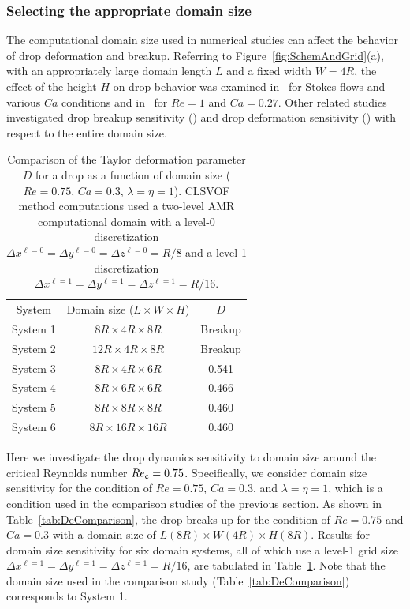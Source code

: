 \documentclass{elsarticle}
\newcommand{\LWH}{L\times W \times H}
\newcommand{\lwh}[3]{L(#1R)\times W(#2R) \times H(#3R)}
\begin{document}
\subsubsection{Selecting the appropriate domain size}

The computational domain size used in numerical studies can affect the behavior
of drop deformation and breakup.  Referring to
Figure~\ref{fig:SchemAndGrid}(a), with an appropriately large domain length $L$
and a fixed width $W=4R$, the effect of the height $H$ on drop behavior was
examined in~\citet{LiRenRen00} for Stokes flows and various $Ca$ conditions and
in~\citet{KomShaEskDer14} for $Re=1$ and $Ca=0.27$.  Other related studies
investigated drop breakup sensitivity (\citet{RenCri01-1}) and drop deformation
sensitivity (\citet{RenCriLi02}) with respect to the entire domain size.
%
\begin{table}[tbh]
\caption{Comparison of the Taylor deformation parameter $D$ for a drop as a function of
         domain size ($Re=0.75$, $Ca=0.3$, $\lambda = \eta = 1$).
         CLSVOF method computations used a two-level AMR computational domain 
         with a level-0 discretization $\Delta x^{\ell=0} = \Delta y^{\ell=0} 
         = \Delta z^{\ell=0} = R/8$ and a level-1 discretization
         $\Delta x^{\ell=1} = \Delta y^{\ell=1} = \Delta z^{\ell=1} = R/16$.}
\label{tab:DomComparison}
\center
\begin{tabular}{ c  c  c}
\hline
\hline
System      & Domain size ($\LWH$)         & $D$     \\
System 1    & $8R  \times 4R  \times 8R$   & Breakup \\
System 2    & $12R \times 4R  \times 8R$   & Breakup \\
System 3    & $8R  \times 4R  \times 6R$   & 0.541   \\
System 4    & $8R  \times 6R  \times 6R$   & 0.466   \\
System 5    & $8R  \times 8R  \times 8R$   & 0.460   \\
System 6    & $8R  \times 16R \times 16R$  & 0.460   \\
\hline
\hline
\end{tabular}
\end{table}
%

Here we investigate the drop dynamics sensitivity to domain size around the
critical Reynolds number $Re_{\rm c}=0.75$.  Specifically, we consider domain size
sensitivity for the condition of $Re=0.75$, $Ca=0.3$, and $\lambda = \eta = 1$,
which is a condition used in the comparison studies of the previous section.
As shown in Table~\ref{tab:DeComparison}, the drop breaks up for the condition
of $Re=0.75$ and $Ca=0.3$ with a domain size of $\lwh{8}{4}{8}$.  Results for
domain size sensitivity for six domain systems, all of which use a level-1 grid
size $\Delta x^{\ell=1} = \Delta y^{\ell=1}= \Delta z^{\ell=1} = R/16$, are
tabulated in Table~\ref{tab:DomComparison}. Note that the domain size used in
the comparison study (Table~\ref{tab:DeComparison}) corresponds to System 1.
\end{document}
